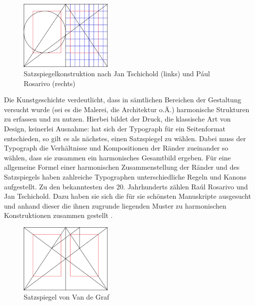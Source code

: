 \documentclass[12pt,a4paper]{article}
\begin{document}
\begin{figure}
\centering
\includegraphics[width=0.4\textwidth]{Bilder/page_construction.png}
\caption{Satzspiegelkonstruktion nach Jan Tschichold (links) und Pául Rosarivo (rechts)\protect\footnotemark[5]}
\label{fig:TschicholdRosarivo}
\end{figure}


Die Kunstgeschichte verdeutlicht, dass in sämtlichen Bereichen der Gestaltung versucht wurde (sei es die Malerei, die Architektur o.Ä.) harmonische Strukturen zu erfassen und zu nutzen. Hierbei bildet der Druck, die klassische Art von Design, keinerlei Ausnahme: hat sich der Typograph für ein Seitenformat entschieden, so gilt es als nächstes, einen Satzspiegel zu wählen. Dabei muss der Typograph die Verhältnisse und Kompositionen der Ränder zueinander so wählen, dass sie zusammen ein harmonisches Gesamtbild ergeben. Für eine allgemeine Formel einer harmonischen Zusammenstellung der Ränder und des Satzspiegels haben zahlreiche Typographen unterschiedliche Regeln und Kanons aufgestellt. Zu den bekanntesten des 20. Jahrhunderts zählen Raúl Rosarivo und Jan Tschichold. Dazu haben sie sich die für sie schönsten Manuskripte ausgesucht und anhand dieser die ihnen zugrunde liegenden Muster zu harmonischen Konstruktionen zusammen gestellt \citep[s.][S.~44]{gestaltungsPrinzipien}.

\begin{figure}
\includegraphics[width=0.4\textwidth]{Bilder/Van_de_Graaf_1.png}
\caption{Satzspiegel von Van de Graf \protect\footnotemark[6]}
\label{fig:VDG}
\end{figure}
\end{document}
